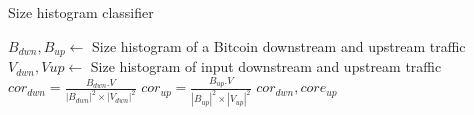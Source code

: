 \begin{algorithm}
\caption{Size histogram classifier}
\label{algo:pktsize_scheme}
\begin{algorithmic}[1]
\State $B_{dwn}, B_{up} \gets $ Size histogram of a Bitcoin downstream and upstream traffic
\State $V_{dwn}, V{up} \gets $ Size histogram of input downstream and upstream traffic
\State $cor_{dwn} = \frac{B_{dwn} . V}{|B_{dwn}|^2 \times |V_{dwn}|^2}$
\State $cor_{up} = \frac{B_{up} . V}{|B_{up}|^2 \times |V_{up}|^2}$
\State \Return $cor_{dwn}, core_{up}$
\EndProcedure
\end{algorithmic}
\end{algorithm}

